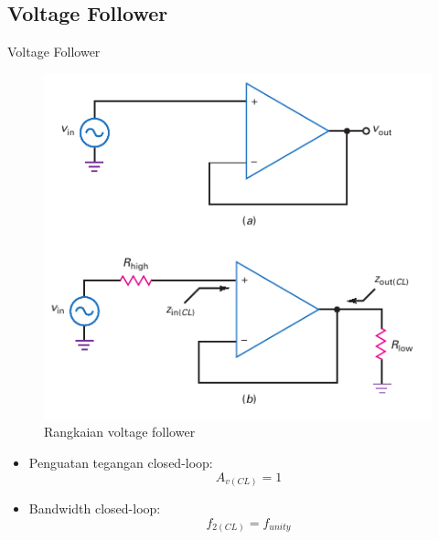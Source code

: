 \subsection{Voltage Follower}
\begin{frame}{Voltage Follower}
	\begin{multicols}{2}
		\begin{figure}
			\centering
			\includegraphics[width=0.9\linewidth]{gambar/fig-16.24}
			\caption{Rangkaian voltage follower}
			\label{fig-16.24}
		\end{figure}
		\columnbreak
		\begin{itemize}
			\item Penguatan tegangan closed-loop:
			\begin{equation}\label{pers.16.15}
				A_{v(CL)} = 1
			\end{equation}
			\item Bandwidth closed-loop:
			\begin{equation}\label{pers.16.16}
				f_{2(CL)} = f_{unity}
			\end{equation}
		\end{itemize}
	\end{multicols}
\end{frame}

